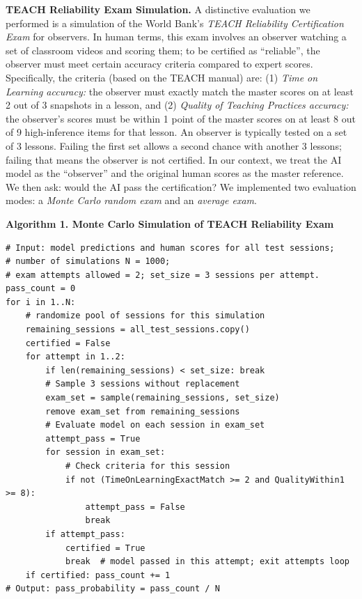 \documentclass[12pt]{article}
\begin{document}
\textbf{TEACH Reliability Exam Simulation.} A distinctive evaluation we performed is a simulation of the World Bank’s \textit{TEACH Reliability Certification Exam} for observers. In human terms, this exam involves an observer watching a set of classroom videos and scoring them; to be certified as “reliable”, the observer must meet certain accuracy criteria compared to expert scores. Specifically, the criteria (based on the TEACH manual) are: (1) \textit{Time on Learning accuracy:} the observer must exactly match the master scores on at least 2 out of 3 snapshots in a lesson, and (2) \textit{Quality of Teaching Practices accuracy:} the observer’s scores must be within 1 point of the master scores on at least 8 out of 9 high-inference items for that lesson. An observer is typically tested on a set of 3 lessons. Failing the first set allows a second chance with another 3 lessons; failing that means the observer is not certified. In our context, we treat the AI model as the “observer” and the original human scores as the master reference. We then ask: would the AI pass the certification? We implemented two evaluation modes: a \textit{Monte Carlo random exam} and an \textit{average exam}.

\vspace{1ex}
\noindent \textbf{Algorithm 1. Monte Carlo Simulation of TEACH Reliability Exam}
\begin{lstlisting}[basicstyle=\small\ttfamily]
# Input: model predictions and human scores for all test sessions;
# number of simulations N = 1000;
# exam attempts allowed = 2; set_size = 3 sessions per attempt.
pass_count = 0
for i in 1..N:
    # randomize pool of sessions for this simulation
    remaining_sessions = all_test_sessions.copy()
    certified = False
    for attempt in 1..2:
        if len(remaining_sessions) < set_size: break
        # Sample 3 sessions without replacement
        exam_set = sample(remaining_sessions, set_size)
        remove exam_set from remaining_sessions
        # Evaluate model on each session in exam_set
        attempt_pass = True
        for session in exam_set:
            # Check criteria for this session
            if not (TimeOnLearningExactMatch >= 2 and QualityWithin1 >= 8):
                attempt_pass = False
                break
        if attempt_pass:
            certified = True
            break  # model passed in this attempt; exit attempts loop
    if certified: pass_count += 1
# Output: pass_probability = pass_count / N
\end{lstlisting}
\end{document}
